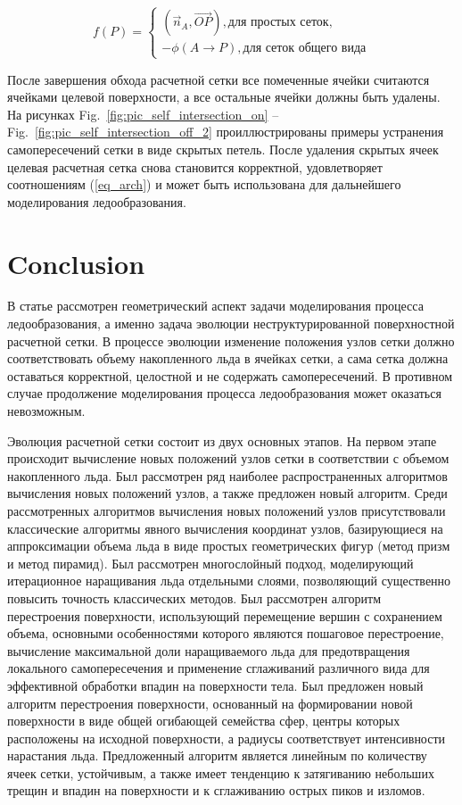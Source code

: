 \documentclass[
11pt,%
tightenlines,%
twoside,%
onecolumn,%
nofloats,%
nobibnotes,%
nofootinbib,%
superscriptaddress,%
noshowpacs,%
centertags]%
{revtex4}
\begin{document}
\begin{equation}
f(P) = 
\begin{cases}
(\vec{n}_A, \vec{OP}), \text{для простых сеток}, \\
-\phi(A \rightarrow P), \text{для сеток общего вида}
\end{cases}
\end{equation}

После завершения обхода расчетной сетки все помеченные ячейки считаются ячейками целевой поверхности, а все остальные ячейки должны быть удалены.
На рисунках Fig.~\ref{fig:pic_self_intersection_on} -- Fig.~\ref{fig:pic_self_intersection_off_2} проиллюстрированы примеры устранения самопересечений сетки в виде скрытых петель.
После удаления скрытых ячеек целевая расчетная сетка снова становится корректной, удовлетворяет соотношениям (\ref{eq_arch}) и может быть использована для дальнейшего моделирования ледообразования.


\section{Conclusion}

В статье рассмотрен геометрический аспект задачи моделирования процесса ледообразования, а именно задача эволюции неструктурированной поверхностной расчетной сетки.
В процессе эволюции изменение положения узлов сетки должно соответствовать объему накопленного льда в ячейках сетки, а сама сетка должна оставаться корректной, целостной и не содержать самопересечений.
В противном случае продолжение моделирования процесса ледообразования может оказаться невозможным.

Эволюция расчетной сетки состоит из двух основных этапов.
На первом этапе происходит вычисление новых положений узлов сетки в соответствии с объемом накопленного льда.
Был рассмотрен ряд наиболее распространенных алгоритмов вычисления новых положений узлов, а также предложен новый алгоритм.
Среди рассмотренных алгоритмов вычисления новых положений узлов присутствовали классические алгоритмы явного вычисления координат узлов, базирующиеся на аппроксимации объема льда в виде простых геометрических фигур (метод призм и метод пирамид).
Был рассмотрен многослойный подход, моделирующий итерационное наращивания льда отдельными слоями, позволяющий существенно повысить точность классических методов.
Был рассмотрен алгоритм перестроения поверхности, использующий перемещение вершин с сохранением объема, основными особенностями которого являются пошаговое перестроение, вычисление максимальной доли наращиваемого льда для предотвращения локального самопересечения и применение сглаживаний различного вида для эффективной обработки впадин на поверхности тела.
Был предложен новый алгоритм перестроения поверхности, основанный на формировании новой поверхности в виде общей огибающей семейства сфер, центры которых расположены на исходной поверхности, а радиусы соответствует интенсивности нарастания льда.
Предложенный алгоритм является линейным по количеству ячеек сетки, устойчивым, а также имеет тенденцию к затягиванию небольших трещин и впадин на поверхности и к сглаживанию острых пиков и изломов.
\end{document}
